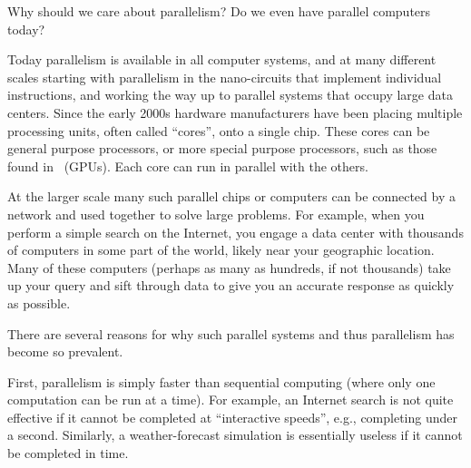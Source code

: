 Why should we care about parallelism?  
%
Do we even have parallel computers today? 

Today parallelism is available in all computer systems, and at many
different scales starting with parallelism in the nano-circuits that
implement individual instructions, and working the way up to parallel
systems that occupy large data centers.  Since the early 2000s
hardware manufacturers have been placing multiple processing units,
often called ``cores'', onto a single chip.  These cores can be
general purpose processors, or more special purpose processors, such as
those found in~ (GPUs).  Each core can
run in parallel with the others.  

At the larger scale many such parallel chips or computers can be
connected by a network and used together to solve large problems.  For
example, when you perform a simple search on the Internet, you engage
a data center with thousands of computers in some part of the world,
likely near your geographic location.
%
Many of these computers (perhaps as many as hundreds, if not
thousands) take up your query and sift through data to give you an
accurate response as quickly as possible.






There are several reasons for why such parallel systems and thus
parallelism has become so prevalent.
%


First, parallelism is simply faster than sequential computing (where
only one computation can be run at a time).
%
For example, an Internet search is not quite effective if it cannot be
completed at ``interactive speeds'', e.g., completing under a second.
%
Similarly, a weather-forecast simulation is essentially useless if it
cannot be completed in time.


